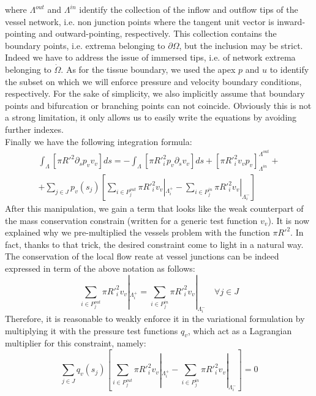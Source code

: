 \documentclass[a4paper]{report}
\begin{document}
where $\Lambda^{out}$ and $\Lambda^{in}$ identify the collection of the inflow and outflow tips of the vessel network, i.e. non junction points where the tangent unit vector is inward-pointing and outward-pointing, respectively. This collection contains the boundary points, i.e. extrema belonging to $\partial \Omega$, but the inclusion may be strict. Indeed we have to address the issue of immersed tips, i.e. of network extrema belonging to $\dot{\Omega}$. As for the tissue boundary, we used the apex $p$ and $u$ to identify the subset on which we will enforce pressure and velocity boundary conditions, respectively. For the sake of simplicity, we also implicitly assume that boundary points and bifurcation or branching points can not coincide. Obviously this is not a strong limitation, it only allows us to easily write the equations by avoiding further indexes.\\
Finally we have the following integration formula:
\begin{equation}
\begin{split}
\int_{\Lambda} [\pi R'^2 \partial_s p_v v_v] ds =-\int_{\Lambda} [\pi R'^2_i  p_v \partial_s v_v]ds +[\pi R'^2_i v_v p_v]^{\Lambda^{out}}_{\Lambda^{in}}+\\
+ \sum_{j \in J }p_v(s_j)[\sum_{i \in P_j^{out}} \pi R'^2_i v_v|_{\Lambda_i^+}-\sum_{i \in P_j^{in}} \pi R'^2_i v_v|_{\Lambda_i^-}]
\end{split}
\end{equation}
After this manipulation, we gain a term that looks like the weak counterpart of the mass conservation constrain (written for a generic test function $v_v$). It is now explained why we pre-multiplied the vessels problem with the function $\pi R'^2$. In fact, thanks to that trick, the desired constraint come to light in a natural way. The conservation of the local flow reate at vessel junctions can be indeed expressed in term of the above notation as follows:
\begin{equation}
\sum_{i \in P_j^{out}} \pi R'^2_i v_v|_{\Lambda_i^+}=\sum_{i \in P_j^{in}} \pi R'^2_i v_v|_{\Lambda_i^-} \quad \forall j \in J
\end{equation}
Therefore, it is reasonable to weakly enforce it  in the variational formulation by multiplying it with the pressure test functions $q_v$, which act as a Lagrangian multiplier for this constraint, namely:
 \begin{equation}
\sum_{j \in J} q_v(s_j)[\sum_{i \in P_j^{out}} \pi R'^2_i v_v|_{\Lambda_i^+}-\sum_{i \in P_j^{in}} \pi R'^2_i v_v|_{\Lambda_i^-} ]=0
\end{equation}
\end{document}
